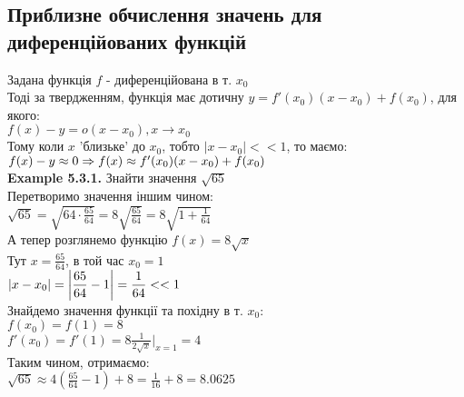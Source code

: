 \documentclass[a4paper, 14pt]{extarticle}
\def\huge{\displaystyle}
\def\bigline{\vspace{5mm}\\}
\def\ex#1{\textbf{Example {#1}}}
\def\bigline{\vspace{5mm}\\}
\begin{document}
\subsection{Приблизне обчислення значень для диференційованих функцій}
Задана функція $f$ - диференційована в т. $x_0$\\
Тоді за твердженням, функція має дотичну $y = f'(x_0)(x-x_0)+f(x_0)$, для якого:\\
$f(x)-y = o(x-x_0), x \to x_0$\\
Тому коли $x$ 'близьке' до $x_0$, тобто $|x-x_0| <<1$, то маємо:\\
$f(x) -y \approx 0 \\ \Rightarrow f(x) \approx f'(x_0)(x-x_0)+f(x_0)$
\bigline
\ex{5.3.1.} Знайти значення $\sqrt{65}$\\
Перетворимо значення іншим чином:\\
$\sqrt{65} \huge = \sqrt{64 \cdot \frac{65}{64}} = 8 \sqrt{\frac{65}{64}} = 8 \sqrt{1 + \frac{1}{64}}$\\
А тепер розглянемо функцію $f(x) = 8\sqrt{x}$\\
Тут $x = \huge \frac{65}{64}$, в той час $x_0 = 1$\\
$|x-x_0| = \huge \abs{\frac{65}{64} - 1} = \frac{1}{64} <<1$\\
Знайдемо значення функції та похідну в т. $x_0$:\\
$f(x_0) = f(1) = 8$\\
$f'(x_0) = f'(1) = \huge 8\frac{1}{2 \sqrt{x}} |_{x = 1} = 4$\\
Таким чином, отримаємо:\\
$\sqrt{65} \approx \huge 4\left(\frac{65}{64}-1\right)+8 = \frac{1}{16} + 8 = 8.0625$
\end{document}

